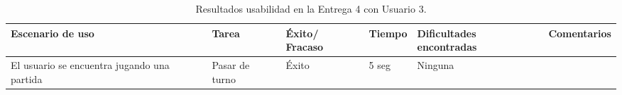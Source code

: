 \begin{table}[h]
  \begin{center}
    \begin{tabular}{|p{2.5cm}|p{1.75cm}|p{1.25cm}|p{1.25cm}|p{2.75cm}|p{3.5cm}|}

      \hline
        \rowcolor{Gray} \textbf{Escenario de uso}
        & \textbf{Tarea}
        & \textbf{Éxito/ Fracaso}
        & \textbf{Tiempo}
        & \textbf{Dificultades encontradas}
        & \textbf{Comentarios}\\

        \hline
        El usuario se encuentra jugando una partida
        & Pasar de turno
        & Éxito
        & 5 seg
        & Ninguna
        &\\

      \hline

    \end{tabular}

    \caption{Resultados usabilidad en la Entrega 4 con Usuario 3.}
    \label{tabla-entrega-4-usuario3}

  \end{center}
\end{table}
